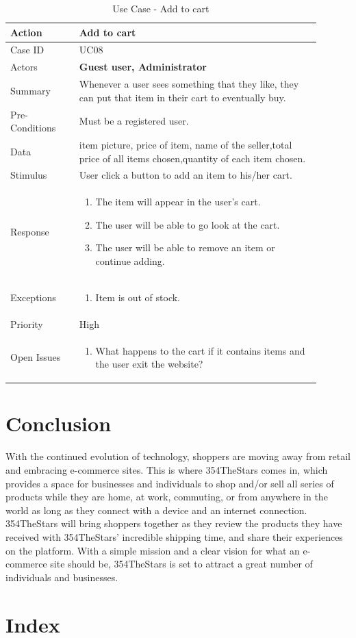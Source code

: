 \documentclass[11pt]{article}
\newcounter{use case ID}
\newcommand\tabularhead[1]{
    \begin{table}[ht]
        \addtocounter{use case ID}{1}
        \caption{Use Case \arabic{use case ID} - #1}
        \vspace{0.2cm}
        \begin{tabular}{|p{0.2\linewidth}|p{0.70\linewidth}|}
            \hline
            \textbf{Action} & \textbf{#1} \\
            \hline}
\newcommand\addrow[2]{#1 & #2\\ \hline}
\newcommand\addmulrow[2]{ \begin{minipage}[t][][t]{2.5cm}#1\end{minipage}
                &\begin{minipage}[t][][t]{11cm}
                    \begin{enumerate}[itemsep=-1ex] #2   \end{enumerate}
                \end{minipage}\vfill\\ \hline}
\newenvironment{usecase}{\tabularhead}
        {\hline\end{tabular}\end{table}}
\begin{document}
\begin{usecase}{Add to cart}
    \addrow{Case ID}{UC08}
    \addrow{Actors}{\textbf{Guest user, Administrator}}
    \addrow{Summary}{Whenever a user sees something that they like, they can put that item in their cart to eventually buy.}
    \addrow{Pre-Conditions}{
       Must be a \index{registered user}registered user.
        }
    \addrow{\index{data}Data}{
item picture, price of item, name of the \index{seller}seller,total price of all items chosen,quantity of each item chosen.}
    \addrow{Stimulus}{User click a button to add an item to his/her cart.}
    \addmulrow{Response}{
        \item The item will appear in the user's cart.
        \item The user will be able to go look at the cart.
        \item The user will be able to remove an item or continue adding.
    }
    \addmulrow{Exceptions}{
        \item Item is out of stock.
    }
    \addrow{Priority}{High}
    \addmulrow{Open Issues}{
        \item What happens to the cart if it contains items and the user exit the website?
    }
\end{usecase}
\clearpage


\section{Conclusion}

With the continued evolution of technology, shoppers are moving away from retail
and embracing e-commerce sites. This is where 354TheStars comes in, which provides
a space for businesses and individuals to shop and/or sell all series of products
while they are home, at work, commuting, or from anywhere in the world as long
as they connect with a device and an internet connection. 354TheStars will bring
shoppers together as they review the products they have received with 354TheStars'
incredible shipping time, and share their experiences on the platform. With a
simple mission and a clear vision for what an e-commerce site should be, 354TheStars
is set to attract a great number of individuals and businesses.


\section{Index}

\printindex
\end{document}
